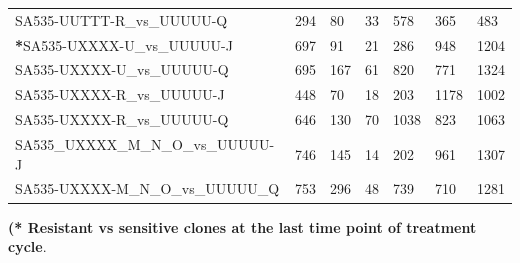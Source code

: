 \begin{landscape}
\begin{table}
{\begin{tabular}{|l|p{3.8em}|p{3.8em}|p{3.8em}|p{3.8em}|p{3.8em}|p{3.8em}|}
SA535-UUTTT-R\_vs\_UUUUU-Q         & 294 & 80  & 33  & 578  & 365  & 483  \\
\textbf{*}SA535-UXXXX-U\_vs\_UUUUU-J & 697 & 91  & 21  & 286  & 948  & 1204 \\
SA535-UXXXX-U\_vs\_UUUUU-Q         & 695 & 167 & 61  & 820  & 771  & 1324 \\
SA535-UXXXX-R\_vs\_UUUUU-J         & 448 & 70  & 18  & 203  & 1178 & 1002 \\
SA535-UXXXX-R\_vs\_UUUUU-Q         & 646 & 130 & 70  & 1038 & 823  & 1063 \\
SA535\_UXXXX\_M\_N\_O\_vs\_UUUUU-J & 746 & 145 & 14  & 202  & 961  & 1307 \\
SA535-UXXXX-M\_N\_O\_vs\_UUUUU\_Q  & 753 & 296 & 48  & 739  & 710  & 1281 \\
  \hline

\end{tabular}
}

\label{tab:numberofDEgenesincistrans}

  \small\textbf{(* Resistant vs sensitive clones at the last time point of treatment cycle}.
\end{table}
\end{landscape}


 

